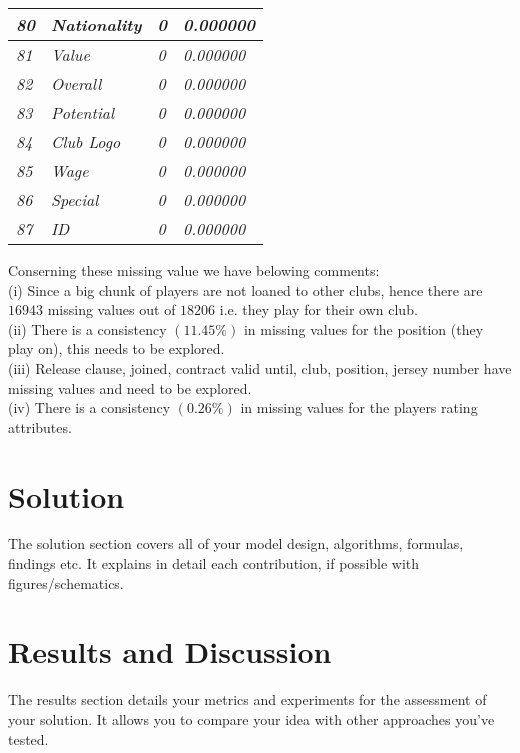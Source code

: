 \documentclass{article}
\begin{document}
\begin{table}[]
\begin{tabular}{|l|l|l|l|}
\textit{80}    & \textit{Nationality}          & \textit{0}             & \textit{0.000000}        \\ \hline
\textit{81}    & \textit{Value}                & \textit{0}             & \textit{0.000000}        \\ \hline
\textit{82}    & \textit{Overall}              & \textit{0}             & \textit{0.000000}        \\ \hline
\textit{83}    & \textit{Potential}            & \textit{0}             & \textit{0.000000}        \\ \hline
\textit{84}    & \textit{Club Logo}            & \textit{0}             & \textit{0.000000}        \\ \hline
\textit{85}    & \textit{Wage}                 & \textit{0}             & \textit{0.000000}        \\ \hline
\textit{86}    & \textit{Special}              & \textit{0}             & \textit{0.000000}        \\ \hline
\textit{87}    & \textit{ID}                   & \textit{0}             & \textit{0.000000}        \\ \hline
\end{tabular}
\end{table}



Conserning these missing value we have belowing comments:\\
(i) Since a big chunk of players are not loaned to other clubs, hence there are $16943$ missing values out of $18206$ i.e. they play for their own club.\\
(ii) There is a consistency $(11.45\%)$ in missing values for the position (they play on), this needs to be explored.\\
(iii) Release clause, joined, contract valid until, club, position, jersey number have missing values and need to be explored.\\
(iv) There is a consistency $(0.26\%)$ in missing values for the players rating attributes.



\section*{Solution}

The solution section covers all of your model design, algorithms, formulas, findings etc. It explains in detail each contribution, if possible with figures/schematics.




\section*{Results and Discussion}
The results section details your metrics and experiments for the assessment of your solution. It allows you to compare your idea with other approaches you've tested. 

\nocite{*}


\end{document}
